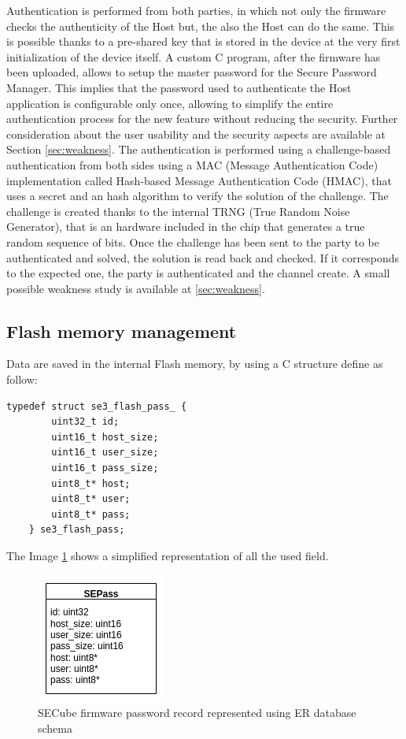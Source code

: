 Authentication is performed from both parties, in which not only the firmware checks the authenticity of the Host but, the also the Host can do the same. This is possible thanks to a pre-shared key that is stored in the device at the very first initialization of the device itself. A custom C program, after the firmware has been uploaded, allows to setup the master password for the Secure Password Manager. This implies that the password used to authenticate the Host application is configurable only once, allowing to simplify the entire authentication process for the new feature without reducing the security. Further consideration about the user usability and the security aspects are available at Section \ref{sec:weakness}.\newline\newline
The authentication is performed using a challenge-based authentication from both sides using a MAC (Message Authentication Code) implementation called Hash-based Message Authentication Code (HMAC), that uses a secret and an hash algorithm to verify the solution of the challenge. The challenge is created thanks to the internal TRNG (True Random Noise Generator), that is an hardware included in the chip that generates a true random sequence of bits. Once the challenge has been sent to the party to be authenticated and solved, the solution is read back and checked. If it corresponds to the expected one, the party is authenticated and the channel create. A small possible weakness study is available at \ref{sec:weakness}.

\subsection{Flash memory management}
Data are saved in the internal Flash memory, by using a C structure define as follow: 
\begin{lstlisting}[style=CStyle]
	typedef struct se3_flash_pass_ {
		uint32_t id;
		uint16_t host_size;
		uint16_t user_size;
		uint16_t pass_size;
		uint8_t* host;
		uint8_t* user;
		uint8_t* pass;
	} se3_flash_pass;
\end{lstlisting}
The Image \ref{fig:sepassrecord} shows a simplified representation of all the used field.
\begin{figure}[H]
	\centering
	\includegraphics[width=0.2\linewidth]{images/firmware/sepass_record}
	\caption{SECube firmware password record represented using ER database schema}
	\label{fig:sepassrecord}
\end{figure}

